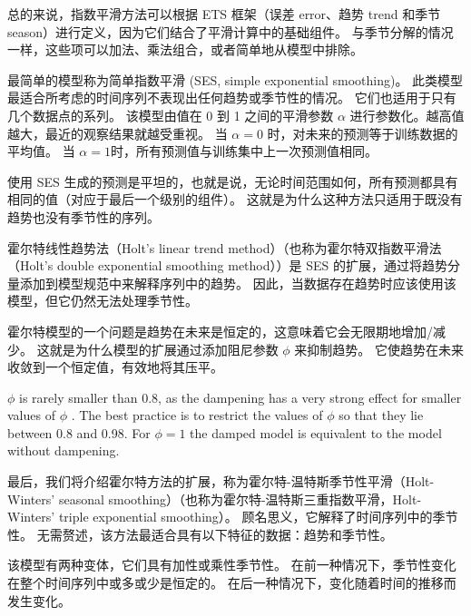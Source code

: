 总的来说，指数平滑方法可以根据 ETS 框架（误差 error、趋势 trend 和季节 season）进行定义，因为它们结合了平滑计算中的基础组件。 与季节分解的情况一样，这些项可以加法、乘法组合，或者简单地从模型中排除。

最简单的模型称为简单指数平滑 (SES, simple exponential smoothing)。 此类模型最适合所考虑的时间序列不表现出任何趋势或季节性的情况。 它们也适用于只有几个数据点的系列。 该模型由值在 0 到 1 之间的平滑参数 $\alpha$ 进行参数化。越高值越大，最近的观察结果就越受重视。 当 $\alpha = 0$ 时，对未来的预测等于训练数据的平均值。 当 $\alpha = 1$时，所有预测值与训练集中上一次预测值相同。

使用 SES 生成的预测是平坦的，也就是说，无论时间范围如何，所有预测都具有相同的值（对应于最后一个级别的组件）。 这就是为什么这种方法只适用于既没有趋势也没有季节性的序列。

霍尔特线性趋势法（Holt's linear trend method）（也称为霍尔特双指数平滑法（Holt's double exponential smoothing method））是 SES 的扩展，通过将趋势分量添加到模型规范中来解释序列中的趋势。 因此，当数据存在趋势时应该使用该模型，但它仍然无法处理季节性。

霍尔特模型的一个问题是趋势在未来是恒定的，这意味着它会无限期地增加/减少。 这就是为什么模型的扩展通过添加阻尼参数 $\phi$ 来抑制趋势。 它使趋势在未来收敛到一个恒定值，有效地将其压平。

\begin{tcolorbox}
    $\phi$ is rarely smaller than 0.8, as the dampening has a very strong effect for smaller values of $\phi$ . The best practice is to restrict the values of $\phi$ so that they lie between 0.8 and 0.98. For $\phi = 1$ the damped model is equivalent to the model without dampening.
\end{tcolorbox}

最后，我们将介绍霍尔特方法的扩展，称为霍尔特-温特斯季节性平滑（Holt-Winters' seasonal smoothing）（也称为霍尔特-温特斯三重指数平滑，Holt-Winters' triple exponential smoothing）。 顾名思义，它解释了时间序列中的季节性。 无需赘述，该方法最适合具有以下特征的数据：趋势和季节性。

该模型有两种变体，它们具有加性或乘性季节性。 在前一种情况下，季节性变化在整个时间序列中或多或少是恒定的。 在后一种情况下，变化随着时间的推移而发生变化。